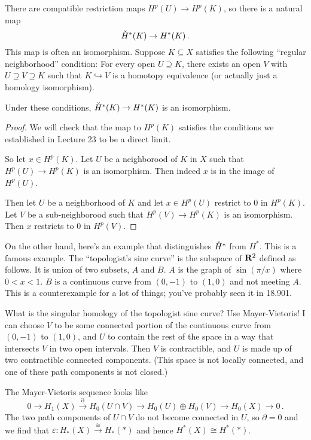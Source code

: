 There are compatible restriction maps $H^p(U)\to H^p(K)$, so there is a natural
map
\[
\check{H}^\ast(K)\to H^\ast(K)\,.
\]
This map is often an isomorphism. Suppose $K\subseteq X$ satisfies the following ``regular neighborhood'' condition: For every open $U\supseteq K$, there exists an open $V$ with $U\supseteq V\supseteq K$ such that $K\hookrightarrow V$ is a homotopy equivalence (or actually just a homology isomorphism).
\begin{lemma} Under these conditions, $\check{H}^\ast(K)\to H^\ast(K)$ is an isomorphism.
\end{lemma}
\begin{proof}
We will check that the map to $H^p(K)$ satisfies the conditions we established in Lecture 23 to be a direct limit. 

So let $x\in H^p(K)$. Let $U$ be a neighborood of $K$ in $X$ such that 
$H^p(U)\to H^p(K)$ is an isomorphism. Then indeed $x$ is in the image of
$H^p(U)$. 

Then let $U$ be a neighborhood of $K$ and let $x\in H^p(U)$ restrict to
0 in $H^p(K)$. Let $V$ be a sub-neighborood such that $H^p(V)\to H^p(K)$
is an isomorphism. Then $x$ restricts to 0 in $H^p(V)$.
\end{proof}

On the other hand, here's an example that distinguishes $\check{H}^\ast$ from $H^\ast$. This is a famous example. The ``topologist's sine curve'' is the subspace of $\mathbf R^2$ defined as follows. It is union of two
subsets, $A$ and $B$. $A$ is the graph of $\sin(\pi/x)$ where $0<x<1$. 
$B$ is a continuous curve from $(0,-1)$ to $(1,0)$ and not meeting $A$. This is a counterexample for a lot of things; you've probably seen it in 18.901.


What is the singular homology of the topologist sine curve? Use Mayer-Vietoris! I can choose $V$ to be some connected portion of the continuous curve from $(0,-1)$ to $(1,0)$, and $U$ to contain the rest of the space in a way that intersects $V$ in two open intervals. Then $V$ is contractible, and $U$ is made up of two contractible connected components. (This space is not locally connected, and one of these path components is not closed.)

The Mayer-Vietoris sequence looks like
\[
0\to H_1(X)\xrightarrow{\partial} H_0(U\cap V)\to H_0(U)\oplus H_0(V)\to H_0(X)\to 0\,.
\]
The two path components of $U\cap V$ do not become connected in $U$, so $\partial=0$ and we find that $\varepsilon:H_*(X)\xrightarrow{\cong}H_*(\ast)$
and hence $H^*(X)\cong H^*(*)$. 

